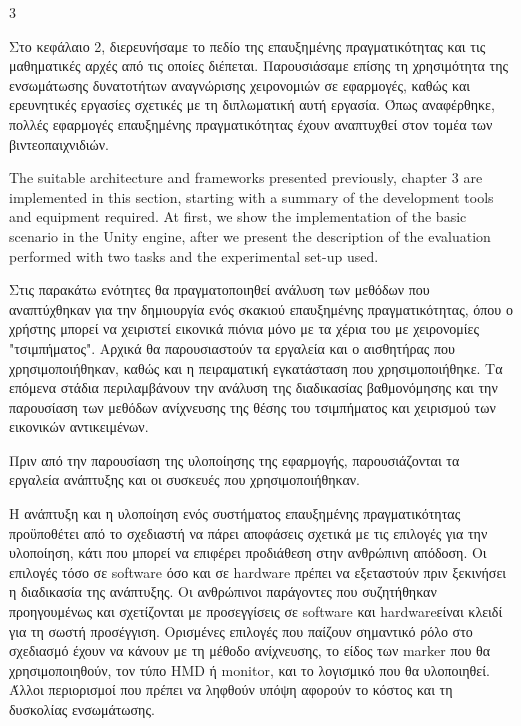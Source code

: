 3%


 \label{c:design}



Στο κεφάλαιο 2, διερευνήσαμε το πεδίο της επαυξημένης πραγματικότητας και τις μαθηματικές αρχές από τις οποίες διέπεται. Παρουσιάσαμε επίσης τη χρησιμότητα της ενσωμάτωσης δυνατοτήτων αναγνώρισης χειρονομιών σε εφαρμογές, καθώς και ερευνητικές εργασίες σχετικές με τη διπλωματική αυτή εργασία. 
Όπως αναφέρθηκε, πολλές εφαρμογές επαυξημένης πραγματικότητας έχουν αναπτυχθεί στον τομέα των βιντεοπαιχνιδιών. 

The suitable architecture and frameworks presented previously, chapter 3 are implemented in this section, starting with a summary of the development tools and equipment required. At first, we show the implementation of the basic scenario in the Unity engine, after we present the
description of the evaluation performed with two tasks and the experimental set-up used.



Στις παρακάτω ενότητες θα πραγματοποιηθεί ανάλυση των μεθόδων που αναπτύχθηκαν για την δημιουργία ενός σκακιού επαυξημένης πραγματικότητας, όπου ο χρήστης μπορεί να χειριστεί εικονικά πιόνια μόνο με τα χέρια του με χειρονομίες "τσιμπήματος". Αρχικά θα παρουσιαστούν τα εργαλεία και ο αισθητήρας που χρησιμοποιήθηκαν, καθώς και η πειραματική εγκατάσταση που χρησιμοποιήθηκε. Τα επόμενα στάδια περιλαμβάνουν την ανάλυση της διαδικασίας βαθμονόμησης και την παρουσίαση των μεθόδων ανίχνευσης της θέσης του τσιμπήματος και χειρισμού των εικονικών αντικειμένων. %

Πριν από την παρουσίαση της υλοποίησης της εφαρμογής, παρουσιάζονται τα εργαλεία ανάπτυξης και οι συσκευές που χρησιμοποιήθηκαν.


Η ανάπτυξη και η υλοποίηση ενός συστήματος επαυξημένης πραγματικότητας προϋποθέτει από το σχεδιαστή να πάρει αποφάσεις σχετικά με τις επιλογές για την υλοποίηση, κάτι που μπορεί να επιφέρει προδιάθεση στην ανθρώπινη απόδοση. Οι επιλογές τόσο σε software όσο και σε  hardware πρέπει να εξεταστούν πριν ξεκινήσει η διαδικασία της ανάπτυξης. Οι ανθρώπινοι παράγοντες που συζητήθηκαν προηγουμένως και σχετίζονται με προσεγγίσεις σε software και hardwareείναι κλειδί για τη σωστή προσέγγιση. Ορισμένες επιλογές που παίζουν σημαντικό ρόλο στο σχεδιασμό έχουν να κάνουν με τη μέθοδο ανίχνευσης, το είδος των marker που θα χρησιμοποιηθούν, τον τύπο HMD ή monitor, και το λογισμικό που θα υλοποιηθεί. Άλλοι περιορισμοί που πρέπει να ληφθούν υπόψη αφορούν το κόστος και τη δυσκολίας ενσωμάτωσης.


